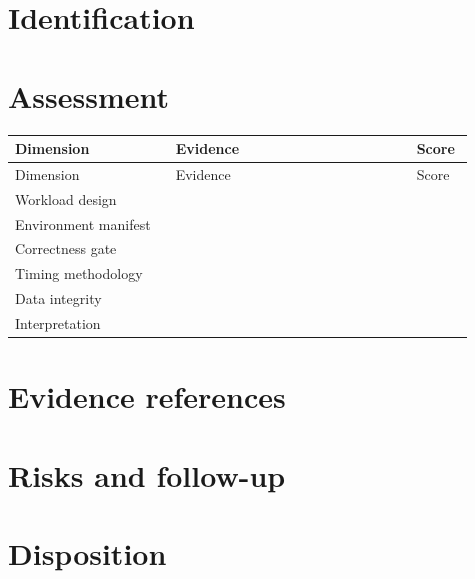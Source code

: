 \documentclass[11pt,letterpaper]{article}
\begin{document}
\tableofcontents
\clearpage
{}
\section{Identification}
\section{Assessment}
\small
\begin{longtable}{@{}p{0.32\linewidth}p{0.48\linewidth}p{0.11\linewidth}@{}}\toprule Dimension & Evidence & Score\\\midrule\endfirsthead\toprule Dimension & Evidence & Score\\\midrule\endhead
Workload design & & \\[1.35em]
Environment manifest & & \\[1.35em]
Correctness gate & & \\[1.35em]
Timing methodology & & \\[1.35em]
Data integrity & & \\[1.35em]
Interpretation & & \\[1.35em]
\bottomrule\end{longtable}\normalsize
\section{Evidence references}
\section{Risks and follow-up}
\section{Disposition}
\end{document}
